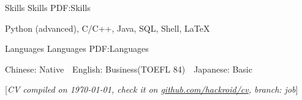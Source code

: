 \documentclass[a4paper,MMMyyyy,nonstopmode]{simpleresumecv}
\newcommand{\CVNote}{CV compiled on {\today}, check it on \href{https://github.com/hackroid/cv}{github.com/hackroid/cv}, branch: job}
\begin{document}
\begin{Body}

    \Section
    {Skills}
    {Skills}
    {PDF:Skills}

    \Entry
    \BulletItem
    Python (advanced),
    C/C++,
    Java,
    SQL,
    Shell,
    {\LaTeX}



    \Section
    {Languages}
    {Languages}
    {PDF:Languages}

    \BulletItem
    Chinese: Native \,\BulletSymbol\, English: Business(TOEFL 84) \,\BulletSymbol\, Japanese: Basic









\end{Body}


\UseNoteFont%
\null\hfill%
[\textit{\CVNote}]
\end{document}
